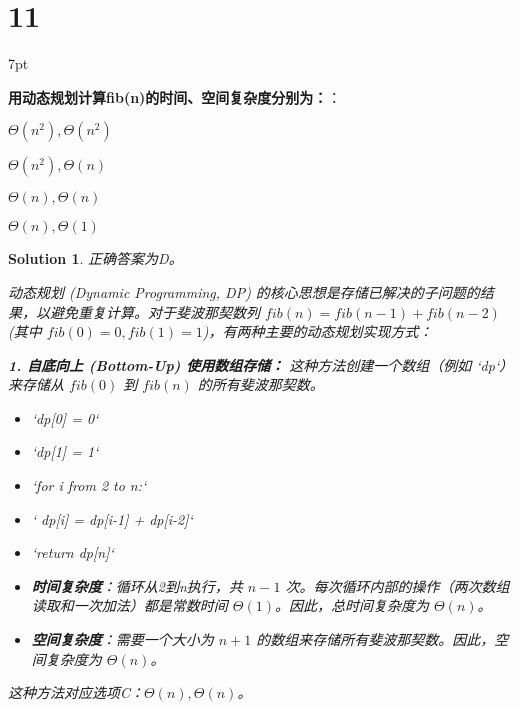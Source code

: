 \documentclass[UTF8]{report}
\newtheorem{solution}{Solution}
\theoremstyle{MyLineTheoremStyle} %
\theoremstyle{MyBlockTheoremStyle} %
\theoremstyle{MySubsubsectionStyle} %
\newenvironment{graybox}{%
        \def\FrameCommand{%
        \hspace{1pt}%
        {\color{gray}\small \vrule width 2pt}%
        {\color{graybox_color}\vrule width 4pt}%
        \colorbox{graybox_color}%
        }%
        \MakeFramed{\advance\hsize-\width\FrameRestore}%
        \noindent\hspace{-4.55pt}%
        \begin{adjustwidth}{}{7pt}%
        \vspace{2pt}\vspace{2pt}%
        }
        {%
        \vspace{2pt}\end{adjustwidth}\endMakeFramed%
        }
\begin{document}
\section*{11}

\begin{graybox}
\textbf{用动态规划计算fib(n)的时间、空间复杂度分别为：}：
\begin{circledenum}
    \item $\Theta(n^2), \Theta(n^2)$
    \item $\Theta(n^2), \Theta(n)$
    \item $\Theta(n), \Theta(n)$
    \item $\Theta(n), \Theta(1)$
\end{circledenum}
\end{graybox}

\begin{solution}
正确答案为D。

动态规划 (Dynamic Programming, DP) 的核心思想是存储已解决的子问题的结果，以避免重复计算。对于斐波那契数列 $fib(n) = fib(n-1) + fib(n-2)$ (其中 $fib(0)=0, fib(1)=1$)，有两种主要的动态规划实现方式：

\textbf{1. 自底向上 (Bottom-Up) 使用数组存储：}
这种方法创建一个数组（例如 `dp`）来存储从 $fib(0)$ 到 $fib(n)$ 的所有斐波那契数。
\begin{itemize}
    \item `dp[0] = 0`
    \item `dp[1] = 1`
    \item `for i from 2 to n:`
    \item `    dp[i] = dp[i-1] + dp[i-2]`
    \item `return dp[n]`
\end{itemize}
\begin{itemize}
    \item \textbf{时间复杂度}：循环从2到n执行，共 $n-1$ 次。每次循环内部的操作（两次数组读取和一次加法）都是常数时间 $\Theta(1)$。因此，总时间复杂度为 $\Theta(n)$。
    \item \textbf{空间复杂度}：需要一个大小为 $n+1$ 的数组来存储所有斐波那契数。因此，空间复杂度为 $\Theta(n)$。
\end{itemize}
这种方法对应选项C：$\Theta(n), \Theta(n)$。


\end{solution}
\end{document}
